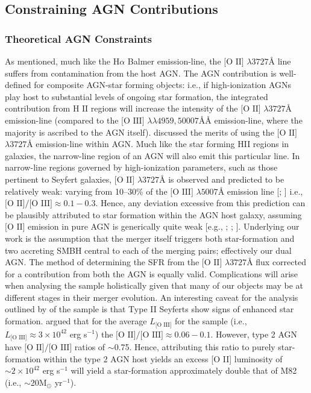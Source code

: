 \subsection{Constraining AGN Contributions}
\subsubsection{Theoretical AGN Constraints}

As mentioned, much like the $\text{H}\alpha$ Balmer emission-line, the $\text{[O II]}$ $\lambda{3727}Å$ line suffers from contamination from the host AGN. The AGN contribution is well-defined for composite AGN-star forming objects: i.e., if high-ionization AGNs play host to substantial levels of ongoing star formation, the integrated contribution from $\text{H II}$ regions will increase the intensity of the $\text{[O II]}$ $\lambda3727Å$  emission-line (compared to the $\text{[O III] }\lambda\lambda4959,50007ÅÅ$ emission-line, where the majority is ascribed to the AGN itself). \cite{2005ApJ...629..680H} discussed the merits of using the $\text{[O II]}$ $\lambda{3727}Å$ emission-line within AGN. Much like the star forming HII regions in galaxies, the narrow-line region of an AGN will also emit this particular line. In narrow-line regions governed by high-ionization parameters, such as those pertinent to Seyfert galaxies, $\text{[O II]}$ $\lambda{3727}Å$ is observed and predicted to be relatively weak: varying from 10--30\% of the $\text{[O III]}$ $\lambda{5007}Å$ emission line [\cite{Ferland_1986}; \cite{Ho_1993}] i.e., $\text{[O II]/[O III]}\approx{0.1-0.3}$. Hence, any deviation excessive from this prediction can be plausibly attributed to star formation within the AGN host galaxy, assuming $\text{[O II]}$ emission in pure AGN is generically quite weak [e.g., \cite{Ferland_1986}; \cite{Ho_1993}; \cite{2006ApJ...642..702K}]. Underlying our work is the assumption that the merger itself triggers both star-formation and two accreting SMBH central to each of the merging pairs; effectively our dual AGN. The method of determining the SFR from the $\text{[O II]}$ $\lambda{3727}Å$ flux corrected for a contribution from both the AGN is equally valid. Complications will arise when analysing the sample holistically given that many of our objects may be at different stages in their merger evolution. An interesting caveat for the analysis outlined by \cite{2006ApJ...642..702K} of the \cite{Zakamska2003} sample is that Type II Seyferts show signs of enhanced star formation. \cite{2006ApJ...642..702K} argued that for the average $L_{\text{[O III]}}$ for the \cite{Zakamska2003} sample (i.e., $L_{\text{[O III]}}\approx{3\times{10^{42}}}$ erg s$^{-1}$) the $\text{[O II]/[O III]}\approx{0.06-0.1}$. However, type 2 AGN have $\text{[O II]/[O III]}$ ratios of $\sim$0.75. Hence, attributing this ratio to purely star-formation within the type 2 AGN host yields an excess [O II] luminosity of $\sim{2\times{10^{42}}}$ erg s$^{-1}$ will yield a star-formation approximately double that of M82 (i.e., $\sim$20M$_{\odot}$ yr$^{-1}$).

